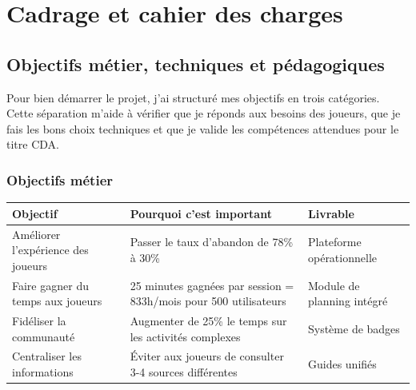 \chapter{Cadrage et cahier des charges}

\section{Objectifs métier, techniques et pédagogiques}

Pour bien démarrer le projet, j'ai structuré mes objectifs en trois catégories. Cette séparation m'aide à vérifier que je réponds aux besoins des joueurs, que je fais les bons choix techniques et que je valide les compétences attendues pour le titre CDA.

\subsection*{Objectifs métier}
\begin{center}
    \begin{tabular}{|p{4cm}|p{6cm}|p{3cm}|}
        \hline
        \textbf{Objectif} & \textbf{Pourquoi c'est important} & \textbf{Livrable} \\
        \hline
        Améliorer l'expérience des joueurs & Passer le taux d'abandon de 78\% à 30\% & Plateforme opérationnelle \\
        \hline
        Faire gagner du temps aux joueurs & 25 minutes gagnées par session = 833h/mois pour 500 utilisateurs & Module de planning intégré \\
        \hline
        Fidéliser la communauté & Augmenter de 25\% le temps sur les activités complexes & Système de badges \\
        \hline
        Centraliser les informations & Éviter aux joueurs de consulter 3-4 sources différentes & Guides unifiés \\
        \hline
    \end{tabular}
\end{center}


